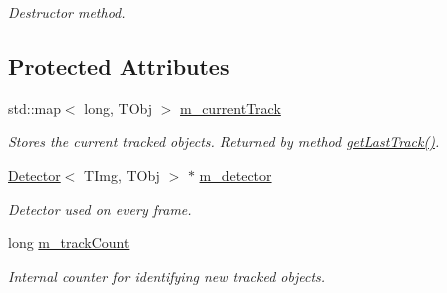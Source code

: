 \begin{DoxyCompactItemize}
\begin{DoxyCompactList}\small\item\em Destructor method. \end{DoxyCompactList}\end{DoxyCompactItemize}
\subsection*{Protected Attributes}
\begin{DoxyCompactItemize}
\item 
\hypertarget{class_vision_core_1_1_abstractions_1_1_detector_based_multi_tracker_a0e0f9bebf9bf7ec1ff1bbac02ad9cca1}{}std\+::map$<$ long, T\+Obj $>$ \hyperlink{class_vision_core_1_1_abstractions_1_1_detector_based_multi_tracker_a0e0f9bebf9bf7ec1ff1bbac02ad9cca1}{m\+\_\+current\+Track}\label{class_vision_core_1_1_abstractions_1_1_detector_based_multi_tracker_a0e0f9bebf9bf7ec1ff1bbac02ad9cca1}

\begin{DoxyCompactList}\small\item\em Stores the current tracked objects. Returned by method \hyperlink{class_vision_core_1_1_abstractions_1_1_detector_based_multi_tracker_a9c8e82bfdf34a35ef2eee54006181e5b}{get\+Last\+Track()}. \end{DoxyCompactList}\item 
\hypertarget{class_vision_core_1_1_abstractions_1_1_detector_based_multi_tracker_a5e56e46f08984f7e62a33e0bf4bb057d}{}\hyperlink{class_vision_core_1_1_interfaces_1_1_detector}{Detector}$<$ T\+Img, T\+Obj $>$ $\ast$ \hyperlink{class_vision_core_1_1_abstractions_1_1_detector_based_multi_tracker_a5e56e46f08984f7e62a33e0bf4bb057d}{m\+\_\+detector}\label{class_vision_core_1_1_abstractions_1_1_detector_based_multi_tracker_a5e56e46f08984f7e62a33e0bf4bb057d}

\begin{DoxyCompactList}\small\item\em Detector used on every frame. \end{DoxyCompactList}\item 
\hypertarget{class_vision_core_1_1_abstractions_1_1_detector_based_multi_tracker_a1ac65c40264a42b7c9af36bb470fcc3a}{}long \hyperlink{class_vision_core_1_1_abstractions_1_1_detector_based_multi_tracker_a1ac65c40264a42b7c9af36bb470fcc3a}{m\+\_\+track\+Count}\label{class_vision_core_1_1_abstractions_1_1_detector_based_multi_tracker_a1ac65c40264a42b7c9af36bb470fcc3a}

\begin{DoxyCompactList}\small\item\em Internal counter for identifying new tracked objects. \end{DoxyCompactList}\end{DoxyCompactItemize}
